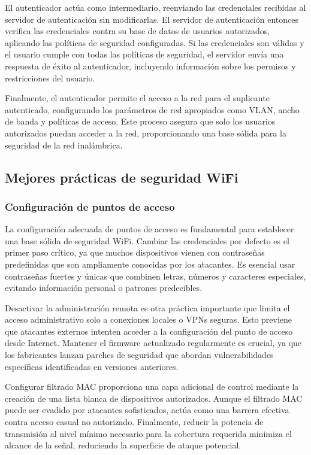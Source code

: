 El autenticador actúa como intermediario, reenviando las credenciales recibidas al servidor de autenticación sin modificarlas. El servidor de autenticación entonces verifica las credenciales contra su base de datos de usuarios autorizados, aplicando las políticas de seguridad configuradas. Si las credenciales son válidas y el usuario cumple con todas las políticas de seguridad, el servidor envía una respuesta de éxito al autenticador, incluyendo información sobre los permisos y restricciones del usuario.

Finalmente, el autenticador permite el acceso a la red para el suplicante autenticado, configurando los parámetros de red apropiados como VLAN, ancho de banda y políticas de acceso. Este proceso asegura que solo los usuarios autorizados puedan acceder a la red, proporcionando una base sólida para la seguridad de la red inalámbrica.

\subsection{Mejores prácticas de seguridad WiFi}

\subsubsection{Configuración de puntos de acceso}

La configuración adecuada de puntos de acceso es fundamental para establecer una base sólida de seguridad WiFi. Cambiar las credenciales por defecto es el primer paso crítico, ya que muchos dispositivos vienen con contraseñas predefinidas que son ampliamente conocidas por los atacantes. Es esencial usar contraseñas fuertes y únicas que combinen letras, números y caracteres especiales, evitando información personal o patrones predecibles.

Desactivar la administración remota es otra práctica importante que limita el acceso administrativo solo a conexiones locales o VPNs seguras. Esto previene que atacantes externos intenten acceder a la configuración del punto de acceso desde Internet. Mantener el firmware actualizado regularmente es crucial, ya que los fabricantes lanzan parches de seguridad que abordan vulnerabilidades específicas identificadas en versiones anteriores.

Configurar filtrado MAC proporciona una capa adicional de control mediante la creación de una lista blanca de dispositivos autorizados. Aunque el filtrado MAC puede ser evadido por atacantes sofisticados, actúa como una barrera efectiva contra acceso casual no autorizado. Finalmente, reducir la potencia de transmisión al nivel mínimo necesario para la cobertura requerida minimiza el alcance de la señal, reduciendo la superficie de ataque potencial.

